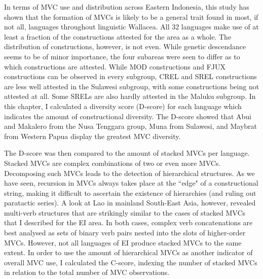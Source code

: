 In terms of MVC use and distribution across Eastern Indonesia, this study has shown that the formation of MVCs is likely to be a general trait found in most, if not all, languages throughout linguistic Wallacea. All 32 languages make use of at least a fraction of the constructions attested for the area as a whole. The distribution of constructions, however, is not even. While genetic descendance seems to be of minor importance, the four subareas were seen to differ as to which constructions are attested. While MOD constructions and FJUX constructions can be observed in every subgroup, CREL and SREL constructions are less well attested in the Sulawesi subgroup, with some constructions being not attested at all. Some SRELs are also hardly attested in the Maluku subgroup. In this chapter, I calculated a diversity score (D-score) for each language which indicates the amount of constructional diversity. The D-score showed that Abui and Makalero from the Nusa Tenggara group, Muna from Sulawesi, and Maybrat from Western Papua display the greatest MVC diversity. 

The D-score was then compared to the amount of stacked MVCs per language. Stacked MVCs are complex combinations of two or even more MVCs. Decomposing such MVCs leads to the detection of hierarchical structures. As we have seen, recursion in MVCs always takes place at the ``edge" of a constructional string, making it difficult to ascertain the existence of hierarchies (and ruling out paratactic series). A look at Lao in mainland South-East Asia, however, revealed multi-verb structures that are strikingly similar to the cases of stacked MVCs that I described for the EI area. In both cases, complex verb concatenations are best analysed as sets of binary verb pairs nested into the slots of higher-order MVCs. However, not all languages of EI produce stacked MVCs to the same extent. In order to use the amount of hierarchical MVCs as another indicator of overall MVC use, I calculated the C-score, indexing the number of stacked MVCs in relation to the total number of MVC observations.

